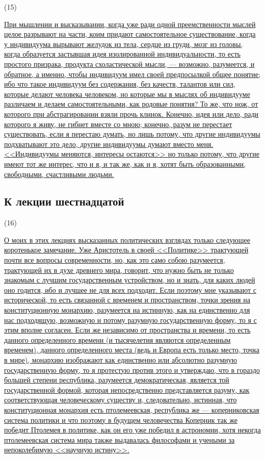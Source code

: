 \documentclass[12pt]{article}
\begin{document}
\hypertarget{15}{(15)} \hyperlink{b15}{При мышлении и высказывании, когда уже ради одной преемственности мыслей целое разрывают на части, коим придают самостоятельное существование, когда у индивидуума вырывают желудок из тела, сердце из груди, мозг из головы, когда образуется застывшая идея изолированной индивидуальности, то есть простого призрака, продукта схоластической мысли, --- возможно, разумеется, и обратное, а именно, чтобы индивидуум имел своей предпосылкой общее понятие; ибо что такое индивидуум без содержания, без качеств, талантов или сил, которые делают человека человеком, но которые мы в мыслях об индивидууме различаем и делаем самостоятельными, как родовые понятия? То же, что нож, от которого при абстрагировании взяли прочь клинок. Конечно, идея или дело, ради которого я живу, не гибнет вместе со мною; конечно, разум не перестает существовать, если я перестаю думать, но лишь потому, что другие индивидуумы подхватывают это дело, другие индивидуумы думают вместо меня. <<Индивидуумы меняются, интересы остаются>>  но только потому, что другие имеют тот же интерес, что и я, и так же, как и я, хотят быть образованными, свободными, счастливыми людьми.}

{}
\subsection*{К лекции шестнадцатой} 

\hypertarget{16}{(16)} \hyperlink{b16}{О моих в этих лекциях высказанных политических взглядах только следующее коротенькое замечание. Уже Аристотель в своей <<Политике>>  трактующей почти все вопросы современности, но, как это само собою разумеется, трактующей их в духе древнего мира, говорит, что нужно быть не только знакомым с лучшим государственным устройством, но и знать, для каких людей оно годится, ибо и лучшее не для всех подходит. Если поэтому мне указывают с исторической, то есть связанной с временем и пространством, точки зрения на конституционную монархию, разумеется на истинную, как на единственно для нас подходящую, возможную и потому разумную государственную форму, то я с этим вполне согласен. Если же независимо от пространства и времени, то есть данного определенного времени (и тысячелетия являются определенным временем), данного определенного места (ведь и Европа есть только место, точка в мире), монархию изображают как единственно или абсолютно разумную государственную форму, то я протестую против этого и утверждаю, что в гораздо большей степени республика, разумеется демократическая, является той государственной формой, которая непосредственно представляется разуму, как соответствующая человеческому существу и, следовательно, истинная, что конституционная монархия есть птолемеевская, республика же --- коперниковская система политики и что поэтому в будущем человечества Коперник так же победит Птолемея в политике, как он его уже победил в астрономии, хотя некогда птолемеевская система мира также выдавалась философами и учеными за непоколебимую <<научную истину>>.}
\end{document}
